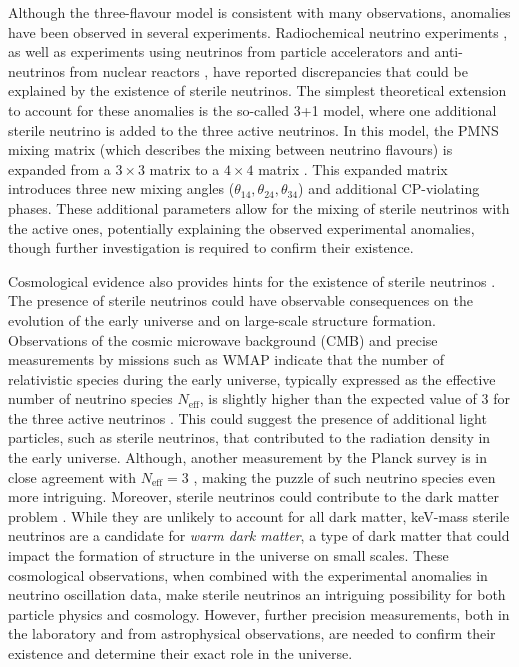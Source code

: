 Although the three-flavour model is consistent with many observations, anomalies have been observed in several experiments. Radiochemical neutrino experiments , as well as experiments using neutrinos from particle accelerators  and anti-neutrinos from nuclear reactors , have reported discrepancies that could be explained by the existence of sterile neutrinos. The simplest theoretical extension to account for these anomalies is the so-called 3+1 model, where one additional sterile neutrino is added to the three active neutrinos. In this model, the PMNS mixing matrix (which describes the mixing between neutrino flavours) is expanded from a $ 3 \times 3$ matrix to a $4 \times 4$ matrix . This expanded matrix introduces three new mixing angles ($\theta_{14}, \theta_{24}, \theta_{34} $) and additional CP-violating phases. These additional parameters allow for the mixing of sterile neutrinos with the active ones, potentially explaining the observed experimental anomalies, though further investigation is required to confirm their existence.

Cosmological evidence also provides hints for the existence of sterile neutrinos . The presence of sterile neutrinos could have observable consequences on the evolution of the early universe and on large-scale structure formation. Observations of the cosmic microwave background (CMB) and precise measurements by missions such as WMAP indicate that the number of relativistic species during the early universe, typically expressed as the effective number of neutrino species  $N_{\text{eff}}$, is slightly higher than the expected value of 3 for the three active neutrinos .  This could suggest the presence of additional light particles, such as sterile neutrinos, that contributed to the radiation density in the early universe. Although, another measurement by the Planck survey is in close agreement with $N_{\text{eff}}=3$ , making the puzzle of such neutrino species even more intriguing.  Moreover, sterile neutrinos could contribute to the dark matter problem . While they are unlikely to account for all dark matter, keV-mass sterile neutrinos are a candidate for \emph{warm dark matter}, a type of dark matter that could impact the formation of structure in the universe on small scales. These cosmological observations, when combined with the experimental anomalies in neutrino oscillation data, make sterile neutrinos an intriguing possibility for both particle physics and cosmology. However, further precision measurements, both in the laboratory and from astrophysical observations, are needed to confirm their existence and determine their exact role in the universe.


